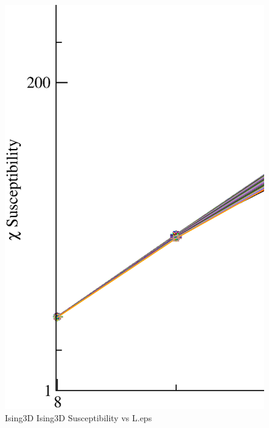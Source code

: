 \begin{figure}[!htpb]
  \centering
  \includegraphics[width=\textwidth]{./plots/Ising3D/Ising3D_Susceptibility_vs_L.eps}
  \caption{Ising3D Ising3D Susceptibility vs L.eps}
\end{figure}


